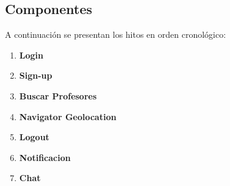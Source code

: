 \subsection{Componentes}
A continuación se presentan los hitos en orden cronológico:
\begin{enumerate}
    \item \textbf {Login} 
    \item \textbf {Sign-up} 
    \item \textbf {Buscar Profesores}
    \item \textbf {Navigator Geolocation} 
    \item \textbf {Logout} 
    
    \item \textbf {Notificacion} 
    
    \item \textbf {Chat} 

    
\end{enumerate}